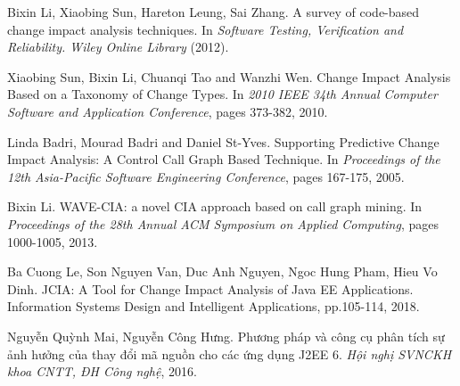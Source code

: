 \documentclass[12pt]{report}
\begin{document}
\begin{thebibliography}{9}
	Bixin Li, Xiaobing Sun, Hareton Leung, Sai Zhang.
	A survey of code-based change impact analysis techniques.
	In \textit{Software Testing, Verification and Reliability. Wiley Online Library} (2012).
	
	Xiaobing Sun, Bixin Li, Chuanqi Tao and Wanzhi Wen. 
	Change Impact Analysis Based on a Taxonomy of Change Types. In \textit{2010 IEEE 34th Annual Computer Software and Application Conference}, pages 373-382, 2010. 
	
	Linda Badri, Mourad Badri and Daniel St-Yves. Supporting Predictive Change Impact Analysis: A Control Call Graph Based Technique. In \textit{Proceedings of the 12th Asia-Pacific Software Engineering Conference}, pages 167-175, 2005.
	
	Bixin Li. WAVE-CIA: a novel CIA approach based on call graph mining. In \textit{Proceedings of the 28th Annual ACM Symposium on Applied Computing}, pages 1000-1005, 2013.
	
	Ba Cuong Le, Son Nguyen Van, Duc Anh Nguyen, Ngoc Hung Pham, Hieu Vo Dinh. JCIA: A Tool for Change Impact Analysis of Java EE Applications. Information Systems Design and Intelligent Applications, pp.105-114, 2018.
	
	Nguyễn Quỳnh Mai, Nguyễn Công Hưng. Phương pháp và công cụ phân tích sự ảnh hưởng của thay đổi mã nguồn cho các ứng dụng J2EE 6. \textit{Hội nghị SVNCKH khoa CNTT, ĐH Công nghệ}, 2016.
\end{thebibliography}
\end{document}
